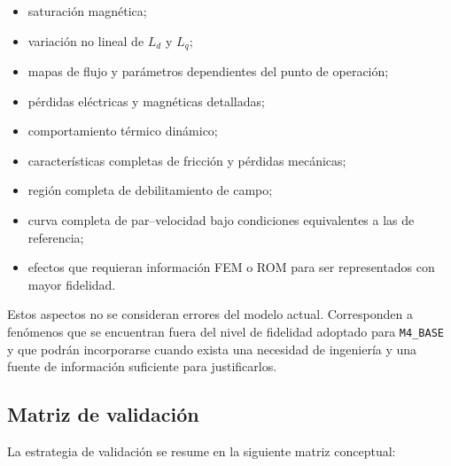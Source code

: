 \begin{itemize}

\item saturación magnética;

\item variación no lineal de \(L_d\) y \(L_q\);

\item mapas de flujo y parámetros dependientes del punto de operación;

\item pérdidas eléctricas y magnéticas detalladas;

\item comportamiento térmico dinámico;

\item características completas de fricción y pérdidas mecánicas;

\item región completa de debilitamiento de campo;

\item curva completa de par--velocidad bajo condiciones equivalentes a las de referencia;

\item efectos que requieran información FEM o ROM para ser representados con mayor fidelidad.

\end{itemize}

Estos aspectos no se consideran errores del modelo actual. Corresponden a fenómenos que se encuentran fuera del nivel de fidelidad adoptado para \texttt{M4\_BASE} y que podrán incorporarse cuando exista una necesidad de ingeniería y una fuente de información suficiente para justificarlos.

\subsection{Matriz de validación}

La estrategia de validación se resume en la siguiente matriz conceptual:

